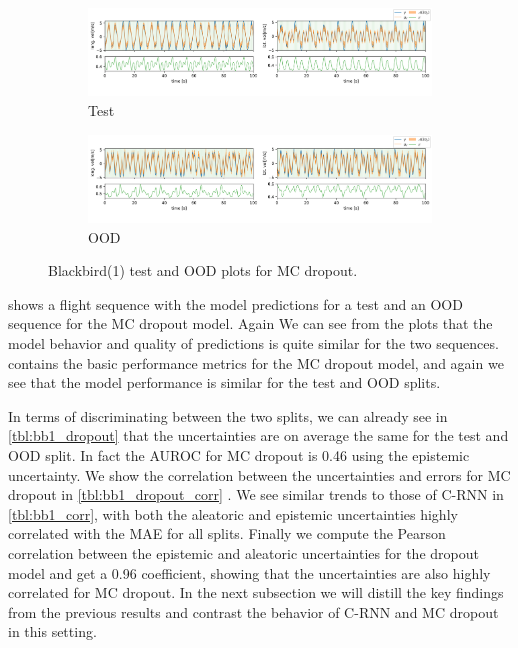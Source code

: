 \begin{figure}[ht]
  \centering
  
  \begin{subfigure}[b]{\textwidth}
    \includegraphics[width=\textwidth]{Experiments/figs/bb1_dropout_test.png}
    \caption{Test}
  \end{subfigure}
  
  \begin{subfigure}[b]{\textwidth}
    \includegraphics[width=\textwidth]{Experiments/figs/bb1_dropout_ood.png}
    \caption{OOD}
  \end{subfigure}
  
  \caption{Blackbird(1) test and OOD plots for MC dropout.}
  \label{fig:bb1_dropout_run}
\end{figure}

 shows a flight sequence with the model predictions for a test and an OOD sequence for the MC dropout model. Again We can see from the plots that the model behavior and quality of predictions is quite similar for the two sequences.  contains the basic performance metrics for the MC dropout model, and again we see that the model performance is similar for the test and OOD splits.

In terms of discriminating between the two splits, we can already see in \cref{tbl:bb1_dropout} that the uncertainties are on average the same for the test and OOD split. In fact the AUROC for MC dropout is 0.46 using the epistemic uncertainty. We show the correlation between the uncertainties and errors for MC dropout in \cref{tbl:bb1_dropout_corr} . We see similar trends to those of C-RNN in \cref{tbl:bb1_corr}, with both the aleatoric and epistemic uncertainties highly correlated with the MAE for all splits. Finally we compute the Pearson correlation between the epistemic and aleatoric uncertainties for the dropout model and get a 0.96 coefficient, showing that the uncertainties are also highly correlated for MC dropout. In the next subsection we will distill the key findings from the previous results and contrast the behavior of C-RNN and MC dropout in this setting.

